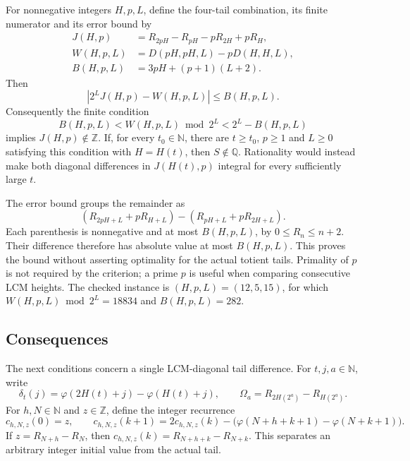 \begin{thm}\label{catalogue:mob:e2}
For nonnegative integers $H,p,L$, define the four-tail combination,
its finite numerator and its error bound by
\[
\begin{aligned}
 J(H,p)&=R_{2pH}-R_{pH}-pR_{2H}+pR_H,\\
 W(H,p,L)&=D(pH,pH,L)-pD(H,H,L),\\
 B(H,p,L)&=3pH+(p+1)(L+2).
\end{aligned}
\]
Then
\[
 |2^LJ(H,p)-W(H,p,L)|\le B(H,p,L).
\]
Consequently the finite condition
\[
 B(H,p,L)<W(H,p,L)\bmod2^L<2^L-B(H,p,L)
\]
implies $J(H,p)\notin\mathbb Z$. If, for every $t_0\in\mathbb N$,
there are $t\ge t_0$, $p\ge1$ and $L\ge0$ satisfying this condition
with $H=H(t)$, then $S\notin\mathbb Q$. Rationality would instead make
both diagonal differences in $J(H(t),p)$ integral for every sufficiently
large $t$.

The error bound groups the remainder as
\[
 (R_{2pH+L}+pR_{H+L})-(R_{pH+L}+pR_{2H+L}).
\]
Each parenthesis is nonnegative and at most $B(H,p,L)$, by
$0\le R_n\le n+2$. Their difference therefore has absolute value at
most $B(H,p,L)$. This proves the bound without asserting optimality for
the actual totient tails. Primality of $p$ is not required by the
criterion; a prime $p$ is useful when comparing consecutive LCM heights.
The checked instance is $(H,p,L)=(12,5,15)$, for which
$W(H,p,L)\bmod2^L=18834$ and $B(H,p,L)=282$.
\end{thm}
\subsection{Consequences}

The next conditions concern a single LCM-diagonal tail difference. For
$t,j,a\in\mathbb N$, write
\[
 \delta_t(j)=\varphi(2H(t)+j)-\varphi(H(t)+j),
 \qquad \Omega_a=R_{2H(2^a)}-R_{H(2^a)}.
\]
For $h,N\in\mathbb N$ and $z\in\mathbb Z$, define the integer recurrence
\[
 c_{h,N,z}(0)=z,\qquad
 c_{h,N,z}(k+1)=2c_{h,N,z}(k)
   -\bigl(\varphi(N+h+k+1)-\varphi(N+k+1)\bigr).
\]
If $z=R_{N+h}-R_N$, then $c_{h,N,z}(k)=R_{N+h+k}-R_{N+k}$.
This separates an arbitrary integer initial value from the actual tail.

